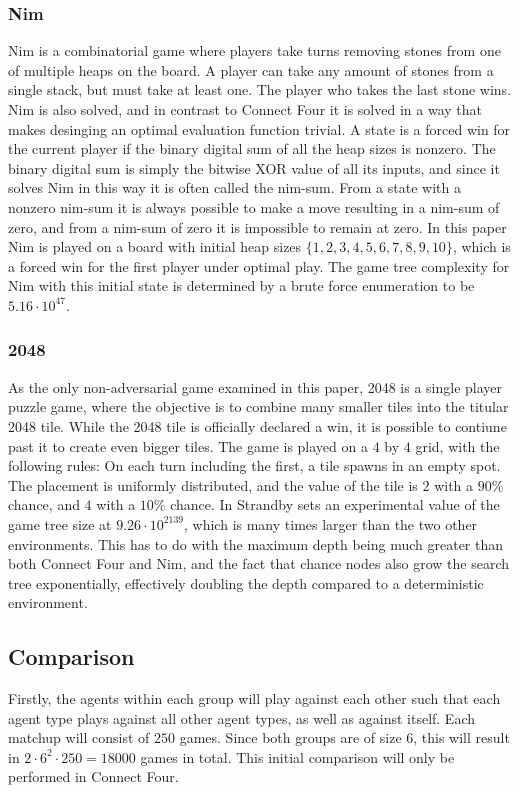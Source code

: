 \subsubsection{Nim}
Nim is a combinatorial game where players take turns removing stones from one of multiple heaps on the board. A player can take any amount of stones from a single stack, but must take at least one. The player who takes the last stone wins. Nim is also solved, and in contrast to Connect Four it is solved in a way that makes desinging an optimal evaluation function trivial. A state is a forced win for the current player if the binary digital sum of all the heap sizes is nonzero. The binary digital sum is simply the bitwise XOR value of all its inputs, and since it solves Nim in this way it is often called the nim-sum. From a state with a nonzero nim-sum it is always possible to make a move resulting in a nim-sum of zero, and from a nim-sum of zero it is impossible to remain at zero. In this paper Nim is played on a board with initial heap sizes $\{1, 2, 3, 4, 5, 6, 7, 8, 9, 10\}$, which is a forced win for the first player under optimal play. The game tree complexity for Nim with this initial state is determined by a brute force enumeration to be $5.16 \cdot 10^{47}$.

\subsubsection{2048}
As the only non-adversarial game examined in this paper, 2048 is a single player puzzle game, where the objective is to combine many smaller tiles into the titular 2048 tile. While the 2048 tile is officially declared a win, it is possible to contiune past it to create even bigger tiles. The game is played on a $4$ by $4$ grid, with the following rules: On each turn including the first, a tile spawns in an empty spot. The placement is uniformly distributed, and the value of the tile is $2$ with a $90\%$ chance, and $4$ with a $10\%$ chance. In \cite{Strandby2016} Strandby sets an experimental value of the game tree size at $9.26 \cdot 10^{2139}$, which is many times larger than the two other environments. This has to do with the maximum depth being much greater than both Connect Four and Nim, and the fact that chance nodes also grow the search tree exponentially, effectively doubling the depth compared to a deterministic environment.

\newpage
\subsection{Comparison}
Firstly, the agents within each group will play against each other
such that each agent type plays against all other agent types, as well
as against itself. Each matchup will consist of $250$ games. Since both groups are of size 6, this will result in $2 \cdot 6^2 \cdot 250 = 18000$ games in total. This initial comparison will only be performed in Connect Four.

